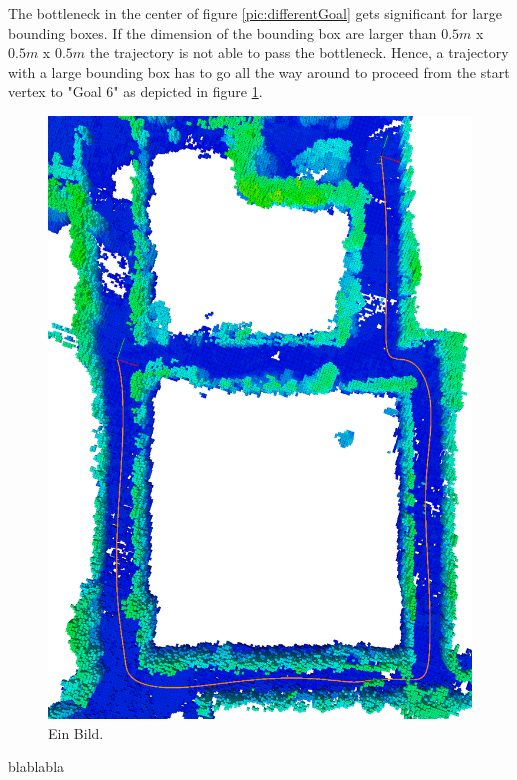 The bottleneck in the center of figure \ref{pic:differentGoal} gets significant for large bounding boxes. If the dimension of the bounding box are larger than $0.5m$ x $0.5m$ x $0.5m$ the trajectory is not able to pass the bottleneck. Hence, a trajectory with a large bounding box has to go all the way around to proceed from the start vertex to "Goal 6" as depicted in figure \ref{pic:Goal6}.


\begin{figure}[ht]
   \centering
   \includegraphics[angle=90, width=1\textwidth]{pics/MapNlopt.png}
   \caption{Ein Bild.}
   \label{pic:Goal6}
\end{figure}

blablabla

